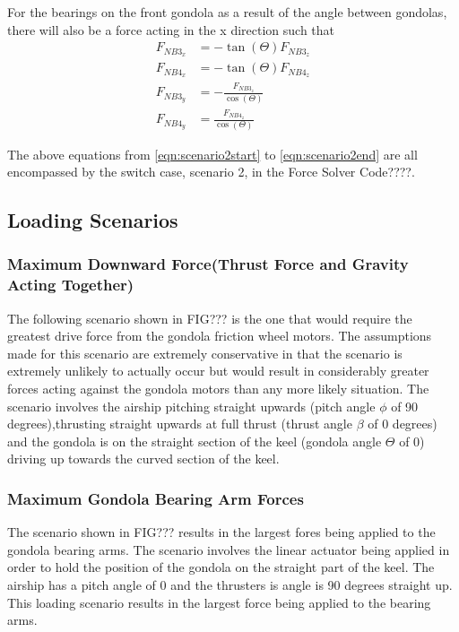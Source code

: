 \documentclass[../main.tex]{subfiles}
\begin{document}
For the bearings on the front gondola as a result of the  angle between gondolas, there will also be a force acting in the x direction such that 
\begin{align}
F_{NB3_{x}} &= -\tan(\Theta) F_{NB3_{z}}\\ 
F_{NB4_{x}} &= -\tan(\Theta) F_{NB4_{z}}\\
F_{NB3_{y}} &= -\frac{F_{NB3_{z}}}{\cos(\Theta)} \\ F_{NB4_{y}} &= \frac{F_{NB4_{z}}}{\cos(\Theta)} \label{eqn:scenario2end}
\end{align}

The above equations from \ref{eqn:scenario2start} to \ref{eqn:scenario2end} are all encompassed by the switch case, scenario 2, in the Force Solver Code????. 


\subsection{Loading Scenarios} \label{loadingScenarios}
\subsubsection*{Maximum Downward Force(Thrust Force and Gravity Acting Together)}
The following scenario shown in FIG??? is the one that would require the greatest drive force from the gondola friction wheel motors. The assumptions made for this scenario are extremely conservative in that the scenario is extremely unlikely to actually occur but would result in considerably greater forces acting against the gondola motors than any more likely situation. The scenario involves the airship pitching straight upwards (pitch angle $\phi$ of 90 degrees),thrusting straight upwards at full thrust (thrust angle $\beta$ of 0 degrees) and the gondola is on the straight section of the keel (gondola angle $\Theta$ of 0) driving up towards the curved section of the keel.

\subsubsection*{Maximum Gondola Bearing Arm Forces}
The scenario shown in FIG??? results in the largest fores being applied to the gondola bearing arms. The scenario involves the linear actuator being applied in order to hold the position of the gondola on the straight part of the keel. The airship has a pitch angle of 0 and the thrusters is  angle is 90 degrees straight up. This loading scenario results in the largest force  being applied to the bearing arms.
\end{document}

